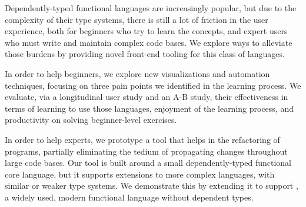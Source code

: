 \documentclass[12pt]{ucsddissertation}
\begin{document}
\begin{dissertationabstract}

Dependently-typed functional languages are increasingly popular, but due to the
complexity of their type systems, there is still a lot of friction in the user
experience, both for beginners who try to learn the concepts, and expert users
who must write and maintain complex code bases.  We explore ways to alleviate
those burdens by providing novel front-end tooling for this class of languages.

In order to help beginners, we explore new visualizations and automation
techniques, focusing on three pain points we identified in the learning process.
We evaluate, via a longitudinal user study and an A-B study, their effectiveness
in terms of learning to use those languages, enjoyment of the learning process,
and productivity on solving beginner-level exercises.

In order to help experts, we prototype a tool that helps in the refactoring of
programs, partially eliminating the tedium of propagating changes throughout
large code bases.  Our tool is built around a small dependently-typed functional
core language, but it supports extensions to more complex languages, with
similar or weaker type systems.  We demonstrate this by extending it to support
\OCaml{}, a widely used, modern functional language without dependent types.

\end{dissertationabstract}

\mainmatter

\begin{dissertationintroduction}




\end{dissertationintroduction}








\appendix



\backmatter

\end{document}
